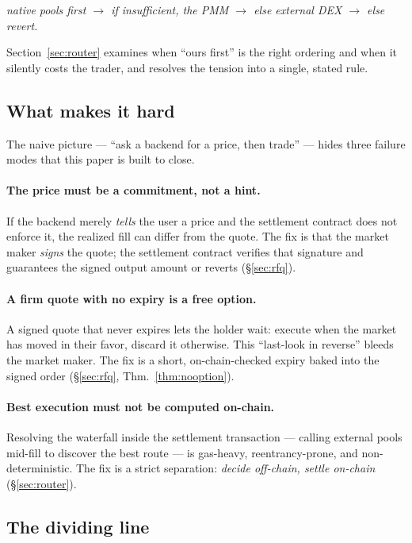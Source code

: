 \begin{center}
\emph{native pools first $\rightarrow$ if insufficient, the PMM
$\rightarrow$ else external DEX $\rightarrow$ else revert.}
\end{center}

\noindent Section~\ref{sec:router} examines when ``ours first'' is the
right ordering and when it silently costs the trader, and resolves the
tension into a single, stated rule.

\subsection{What makes it hard}

The naive picture --- ``ask a backend for a price, then trade'' --- hides
three failure modes that this paper is built to close.

\paragraph{The price must be a commitment, not a hint.} If the backend
merely \emph{tells} the user a price and the settlement contract does
not enforce it, the realized fill can differ from the quote. The fix is
that the market maker \emph{signs} the quote; the settlement contract
verifies that signature and guarantees the signed output amount or
reverts (\S\ref{sec:rfq}).

\paragraph{A firm quote with no expiry is a free option.} A signed
quote that never expires lets the holder wait: execute when the market
has moved in their favor, discard it otherwise. This ``last-look in
reverse'' bleeds the market maker. The fix is a short, on-chain-checked
expiry baked into the signed order (\S\ref{sec:rfq}, Thm.~\ref{thm:nooption}).

\paragraph{Best execution must not be computed on-chain.} Resolving the
waterfall inside the settlement transaction --- calling external pools
mid-fill to discover the best route --- is gas-heavy, reentrancy-prone,
and non-deterministic. The fix is a strict separation: \emph{decide
off-chain, settle on-chain} (\S\ref{sec:router}).

\subsection{The dividing line}

